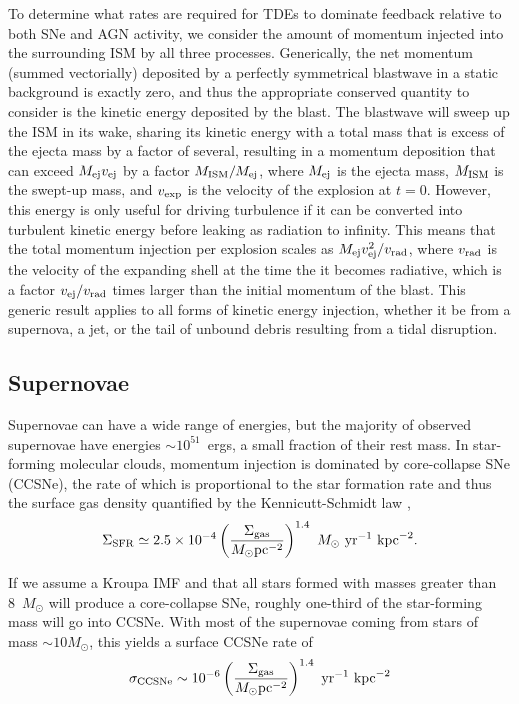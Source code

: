\documentclass[preprint2]{aastex}
\begin{document}
To determine what rates are required for TDEs to dominate feedback relative to both SNe and AGN activity, we consider the amount of momentum injected into the surrounding ISM by all three processes. Generically, the net momentum (summed vectorially) deposited by a perfectly symmetrical blastwave in a static background is exactly zero, and thus the appropriate conserved quantity to consider is the kinetic energy deposited by the blast. The blastwave will sweep up the ISM in its wake, sharing its kinetic energy with a total mass that is excess of the ejecta mass by a factor of several, resulting in a momentum deposition that can exceed $M_{\rm ej} v_{\rm ej}$ by a factor $M_{\rm ISM}/M_{\rm ej}$, where $M_{\rm ej}$ is the ejecta mass, $M_{\rm ISM}$ is the swept-up mass, and $v_{\rm exp}$ is the velocity of the explosion at $t = 0$. However, this energy is only useful for driving turbulence if it can be converted into turbulent kinetic energy before leaking as radiation to infinity. This means that the total momentum injection per explosion scales as $M_{\rm ej} v_{\rm ej}^{2}/ v_{\rm rad}$, where $v_{\rm rad}$ is the velocity of the expanding shell at the time the it becomes radiative, which is a factor $v_{\rm ej}/ v_{\rm rad}$ times larger than the initial momentum of the blast. This generic result applies to all forms of kinetic energy injection, whether it be from a supernova, a jet, or the tail of unbound debris resulting from a tidal disruption.

\subsection{Supernovae}\label{subsec:sne}

Supernovae can have a wide range of energies, but the majority of observed supernovae have energies $\sim 10^{51}$~ergs, a small fraction of their rest mass. In star-forming molecular clouds, momentum injection is dominated by core-collapse SNe (CCSNe), the rate of which is proportional to the star formation rate and thus the surface gas density quantified by the Kennicutt-Schmidt law \citep{Kennicutt:1998a},
\begin{equation}
\Sigma_{\rm SFR} \simeq 2.5 \times 10^{-4} \left(\frac{\Sigma_{\rm gas}}{M_{\odot} {\rm pc}^{-2}}\right)^{1.4}~M_{\odot}~{\rm yr}^{-1}~{\rm kpc}^{-2}.
\end{equation}

If we assume a Kroupa IMF \citep{Kroupa:2001a} and that all stars formed with masses greater than 8~$M_{\odot}$ will produce a core-collapse SNe, roughly one-third of the star-forming mass will go into CCSNe. With most of the supernovae coming from stars of mass $\sim 10 M_{\odot}$, this yields a surface CCSNe rate of
\begin{equation}
\sigma_{\rm CCSNe} \sim 10^{-6} \left(\frac{\Sigma_{\rm gas}}{M_{\odot} {\rm pc}^{-2}}\right)^{1.4}~{\rm yr}^{-1}~{\rm kpc}^{-2}\label{eq:gammasne}
\end{equation}
\end{document}
